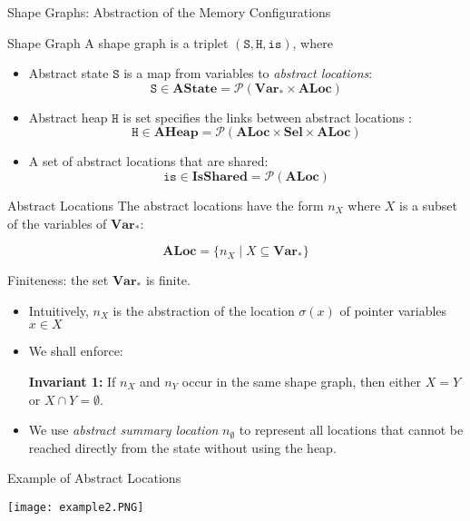 \documentclass[aspectratio=1610, 13pt]{beamer}
\begin{document}
\begin{frame}{Shape Graphs: Abstraction of the Memory Configurations}
    \begin{definition}{Shape Graph}
        A shape graph is a triplet $(\texttt{S}, \texttt{H}, \texttt{is})$, where
        \begin{itemize}
            \item Abstract state $\texttt{S}$ is a map from variables to \emph{abstract locations}: 
            \[\texttt{S}\in \mathbf{AState} = \mathcal{P}\mathbf{(Var_*\times ALoc)}\]
            
            \item Abstract heap $\texttt{H}$ is set specifies the links between abstract locations : 
            \[\texttt{H}\in \mathbf{AHeap} = \mathcal{P}\mathbf{(ALoc \times Sel\times ALoc)}\]
            
            \item A set of abstract locations that are shared: 
            \[\texttt{is} \in \mathbf{IsShared} = \mathcal{P}\mathbf{(ALoc)}\]
        \end{itemize}
    \end{definition}
\end{frame}

\begin{frame}{Abstract Locations}
    The abstract locations have the form $n_X$ where $X$ is a subset of the variables of $\mathbf{Var}_*$:
    
    \[\mathbf{ALoc} = \{n_X\mid X\subseteq \mathbf{Var}_*\}\]
    
    Finiteness: the set $\mathbf{Var}_*$ is finite.
\begin{itemize}
    \item 
    Intuitively, $n_X$ is the abstraction of the location $\sigma(x)$ of pointer variables  $x \in X$
    \item We shall enforce: 
    
    \textbf{Invariant 1: } If $n_X$ and $n_Y$ occur in the same shape graph, then either $X = Y$ or $X \cap Y = \emptyset$.
    \item We use \emph{abstract summary location} $n_\emptyset $ to represent all locations that cannot be reached directly from the state without using the heap. 
\end{itemize}
\end{frame}

\begin{frame}{Example of Abstract Locations}
\begin{center}
        \texttt{[image: example2.PNG]}
\end{center}

    
\end{frame}
\end{document}
